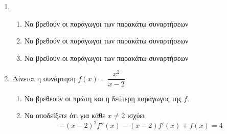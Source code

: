 \begin{enumerate}[leftmargin=0mm]
\item
\begin{enumerate}
\item Να βρεθούν οι παράγωγοι των παρακάτω συναρτήσεων
\begin{multicols}{3}
\end{multicols}
\item Να βρεθούν οι παράγωγοι των παρακάτω συναρτήσεων
\begin{multicols}{3}
\end{multicols}
\item Να βρεθούν οι παράγωγοι των παρακάτω συναρτήσεων
\begin{multicols}{2}
\end{multicols}
\end{enumerate}

\item
Δίνεται η συνάρτηση $ f(x)=\dfrac{x^2}{x-2} $.
\begin{enumerate}
\item Nα βρεθεούν οι πρώτη και η δεύτερη παράγωγος της $ f $.
\item Να αποδείξετε ότι για κάθε $ x\neq 2 $ ισχύει
\[ -(x-2)^2f''(x)-(x-2)f'(x)+f(x)=4 \]
\end{enumerate}


\end{enumerate}
